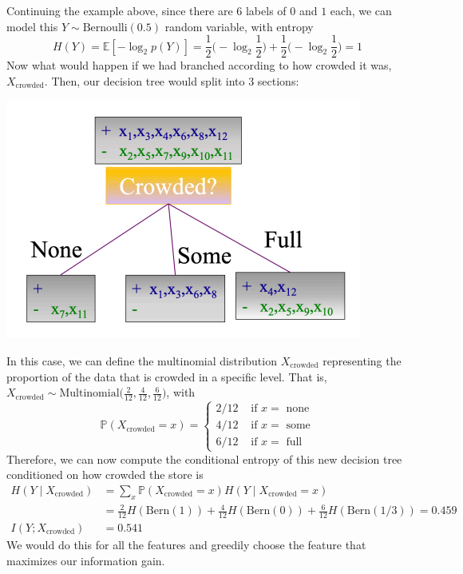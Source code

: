 \documentclass{article}
\begin{document}
    \begin{example}
    Continuing the example above, since there are $6$ labels of $0$ and $1$ each, we can model this $Y \sim \mathrm{Bernoulli}(0.5)$ random variable, with entropy 
    \[H(Y) = \mathbb{E}[-\log_2 p(Y)] = \frac{1}{2} \big( -\log_2 \frac{1}{2} \big) + \frac{1}{2} \big( -\log_2 \frac{1}{2} \big) = 1\]
    Now what would happen if we had branched according to how crowded it was, $X_{\mathrm{crowded}}$. Then, our decision tree would split into 3 sections: 
    \begin{center}
      \includegraphics[scale=0.5]{img/decision_crowded.png}
    \end{center}
    In this case, we can define the multinomial distribution $X_{\mathrm{crowded}}$ representing the proportion of the data that is crowded in a specific level. That is, $X_{\mathrm{crowded}} \sim \mathrm{Multinomial}(\frac{2}{12}, \frac{4}{12}, \frac{6}{12} \big)$, with 
    \[\mathbb{P}(X_{\mathrm{crowded}} = x) = \begin{cases} 2/12 & \text{ if } x = \text{ none} \\ 4/12 & \text{ if } x = \text{ some} \\ 6/12 & \text{ if } x = \text{ full} \end{cases} \]
    Therefore, we can now compute the conditional entropy of this new decision tree conditioned on how crowded the store is 
    \begin{align*}
        H(Y \mid X_{\mathrm{crowded}}) & = \sum_x \mathbb{P}(X_{\mathrm{crowded}} = x) H(Y \mid X_{\mathrm{crowded}} = x) \\
        & = \frac{2}{12} H(\mathrm{Bern}(1)) + \frac{4}{12} H(\mathrm{Bern}(0)) + \frac{6}{12} H(\mathrm{Bern}(1/3)) = 0.459 \\
        I(Y; X_{\mathrm{crowded}}) & = 0.541
    \end{align*}
    We would do this for all the features and greedily choose the feature that maximizes our information gain. 
    \end{example}
\end{document}
